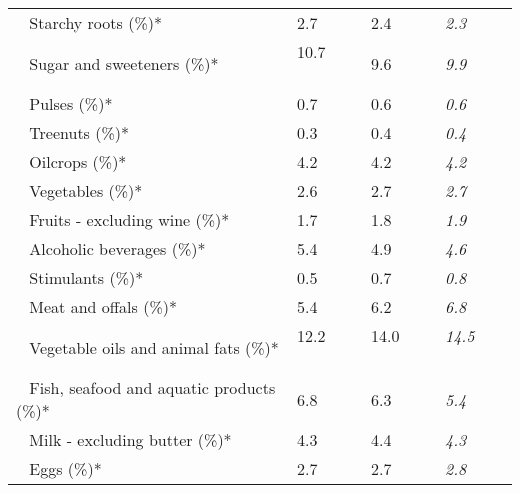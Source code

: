 \begin{tabular}{L{3.9cm} R{1cm} R{1cm} R{1cm}}
	 ~ Starchy roots (\%)* & 2.7 ~ \ \ & 2.4 ~ \ \ & \textit{2.3} ~ \ \ \\ 
	 ~ Sugar and sweeteners (\%)* & 10.7 ~ \ \ & 9.6 ~ \ \ & \textit{9.9} ~ \ \ \\ 
	 ~ Pulses (\%)* & 0.7 ~ \ \ & 0.6 ~ \ \ & \textit{0.6} ~ \ \ \\ 
	 ~ Treenuts (\%)* & 0.3 ~ \ \ & 0.4 ~ \ \ & \textit{0.4} ~ \ \ \\ 
	 ~ Oilcrops (\%)* & 4.2 ~ \ \ & 4.2 ~ \ \ & \textit{4.2} ~ \ \ \\ 
	 ~ Vegetables (\%)* & 2.6 ~ \ \ & 2.7 ~ \ \ & \textit{2.7} ~ \ \ \\ 
	 ~ Fruits - excluding wine (\%)* & 1.7 ~ \ \ & 1.8 ~ \ \ & \textit{1.9} ~ \ \ \\ 
	 ~ Alcoholic beverages (\%)* & 5.4 ~ \ \ & 4.9 ~ \ \ & \textit{4.6} ~ \ \ \\ 
	 ~ Stimulants (\%)* & 0.5 ~ \ \ & 0.7 ~ \ \ & \textit{0.8} ~ \ \ \\ 
	 ~ Meat and offals (\%)* & 5.4 ~ \ \ & 6.2 ~ \ \ & \textit{6.8} ~ \ \ \\ 
	 ~ Vegetable oils and animal fats (\%)* & 12.2 ~ \ \ & 14.0 ~ \ \ & \textit{14.5} ~ \ \ \\ 
	 ~ Fish, seafood and aquatic products (\%)* & 6.8 ~ \ \ & 6.3 ~ \ \ & \textit{5.4} ~ \ \ \\ 
	 ~ Milk - excluding butter (\%)* & 4.3 ~ \ \ & 4.4 ~ \ \ & \textit{4.3} ~ \ \ \\ 
	 ~ Eggs (\%)* & 2.7 ~ \ \ & 2.7 ~ \ \ & \textit{2.8} ~ \ \ \\ 
       \toprule
      \end{tabular}
      \clearpage
{}
